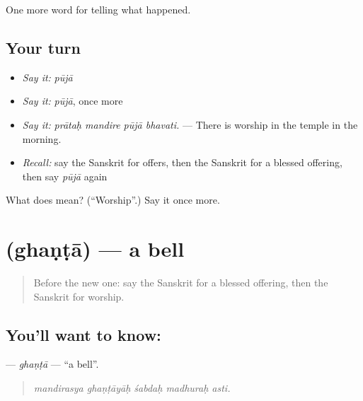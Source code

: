 \begin{grammarlens}[title={What you've built}]
One more word for telling what happened.
\end{grammarlens}

\subsection*{Your turn}
\begin{itemize}
\raggedright
  \item \emph{Say it:} \emph{pūjā}
  \item \emph{Say it:} \emph{pūjā}, once more
  \item \emph{Say it:} \emph{prātaḥ mandire pūjā bhavati.} — There is worship in the temple in the morning.
  \item \emph{Recall:} say the Sanskrit for offers, then the Sanskrit for a blessed offering, then say \emph{pūjā} again
\end{itemize}

\begin{tcolorbox}[breakable,colback=teal!4,colframe=teal!35!black,title={Before you move on}]
What does  mean? (\textquotedblleft{}Worship\textquotedblright{}.) Say it once more.
\end{tcolorbox}
\section[\texorpdfstring{\sk{घण्टा} (ghaṇṭā)}{घण्टा (ghaṇṭā)}]{ (ghaṇṭā) — a bell}

\label{lesson:SA-C329-ghanta}



\begin{quote}
Before the new one: say the Sanskrit for a blessed offering, then the Sanskrit for worship.
\end{quote}

\subsection*{You'll want to know: }
\textbf{} — \emph{ghaṇṭā} — \textquotedblleft{}a bell\textquotedblright{}.

\begin{quote}
    
\end{quote}

\begin{quote}
\emph{mandirasya ghaṇṭāyāḥ śabdaḥ madhuraḥ asti.}
\end{quote}

